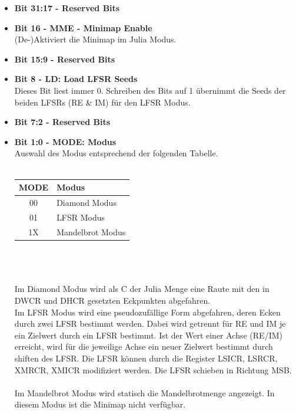 \begin{itemize}
    \item \textbf{Bit 31:17 - Reserved Bits}
    \item \textbf{Bit 16 - MME - Minimap Enable} \\
    (De-)Aktiviert die Minimap im Julia Modus.
    \item \textbf{Bit 15:9 - Reserved Bits}
    \item \textbf{Bit 8 - LD: Load LFSR Seeds} \\
    Dieses Bit liest immer 0.
    Schreiben des Bits auf 1 übernimmt die Seeds der beiden LFSRs (RE \& IM) für den LFSR Modus.
    \item \textbf{Bit 7:2 - Reserved Bits}
    \item \textbf{Bit 1:0 - MODE: Modus}\\
    Auswahl des Modus entsprechend der folgenden Tabelle. \\ \\
    \begin{tabular}{c|l}
        MODE & Modus \\
        \hline
        00 & Diamond Modus \\
        01 & LFSR Modus \\
        1X & Mandelbrot Modus \\
    \end{tabular}
    \\ \\ \\
    Im Diamond Modus wird als C der Julia Menge eine Raute mit den in DWCR und DHCR gesetzten Eckpunkten abgefahren.\\
    Im LFSR Modus wird eine pseudozufällige Form abgefahren, deren Ecken durch zwei LFSR bestimmt werden.
    Dabei wird getrennt für RE und IM je ein Zielwert durch ein LFSR bestimmt.
    Ist der Wert einer Achse (RE/IM) erreicht, wird für die jeweilige Achse ein neuer Zielwert bestimmt durch shiften des LFSR.
    Die LFSR können durch die Register LSICR, LSRCR, XMRCR, XMICR modifiziert werden.
    Die LFSR schieben in Richtung MSB. \\ \\
    Im Mandelbrot Modus wird statisch die Mandelbrotmenge angezeigt.
    In diesem Modus ist die Minimap nicht verfügbar.
\end{itemize}

